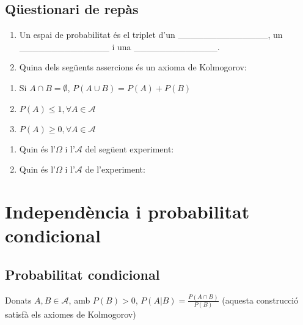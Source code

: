 \documentclass[letterpaper,10pt,english]{sphinxmanual}
\begin{document}
\subsection{Qüestionari de repàs}
\label{\detokenize{0_Intro/0_1_Repas_probabilitat:questionari-de-repas}}\begin{enumerate}
%
\item {} 
Un espai de probabilitat és el triplet d’un \_\_\_\_\_\_\_\_\_\_\_\_\_\_, un \_\_\_\_\_\_\_\_\_\_\_\_\_\_ i una \_\_\_\_\_\_\_\_\_\_\_\_\_.

\item {} 
Quina dels següents assercions  és un axioma de Kolmogorov:

\end{enumerate}
\begin{enumerate}
%
\item {} 
Si \(A \cap B = \emptyset\), \(P\left(A \cup B \right) = P\left(A \right) + P\left( B \right)\)

\item {} 
\(P\left(A\right) \leq 1, \forall A \in \mathcal{A}\)

\item {} 
\(P\left(A\right) \geq 0, \forall A \in \mathcal{A}\)

\end{enumerate}
\begin{enumerate}
%
\setcounter{enumi}{2}
\item {} 
Quin és l’\(\Omega\) i l’\(\mathcal{A}\) del següent experiment: 

\item {} 
Quin és l’\(\Omega\) i l’\(\mathcal{A}\) de l’experiment: 

\end{enumerate}


\section{Independència i probabilitat condicional}
\label{\detokenize{0_Intro/0_1_Repas_probabilitat:independencia-i-probabilitat-condicional}}

\subsection{Probabilitat condicional}
\label{\detokenize{0_Intro/0_1_Repas_probabilitat:probabilitat-condicional}}
Donats \(A, B \in \mathcal{A}\), amb \(P\left(B\right) > 0\),
\(P\left(A|B\right) = \frac{P\left(A \cap B\right)}{P\left(B\right)}\) (aquesta construcció satisfà els axiomes de Kolmogorov)
\end{document}
